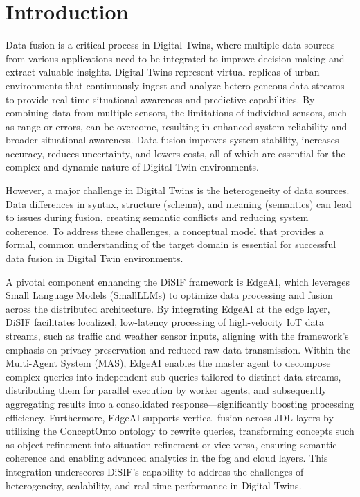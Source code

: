 \documentclass[5p,times]{elsarticle}
\begin{document}
\section{Introduction}
Data fusion is a critical process in Digital Twins,
where multiple data sources from various applications need to
be integrated to improve decision-making and extract valuable
insights. Digital Twins represent virtual replicas of
urban environments that continuously ingest and analyze hetero
geneous data streams to provide real-time situational awareness
and predictive capabilities. By combining data from multiple
sensors, the limitations of individual sensors, such as range or
errors, can be overcome, resulting in enhanced system reliability
and broader situational awareness. Data fusion improves system
stability, increases accuracy, reduces uncertainty, and lowers
costs, all of which are essential for the complex and dynamic
nature of Digital Twin environments.

However, a major challenge in Digital Twins is
the heterogeneity of data sources. Data differences in syntax,
structure (schema), and meaning (semantics) can lead to issues
during fusion, creating semantic conflicts and reducing system
coherence. To address these challenges, a conceptual model
that provides a formal, common understanding of the target
domain is essential for successful data fusion in Digital Twin
environments.

A pivotal component enhancing the DiSIF framework is EdgeAI,
 which leverages Small Language Models (SmallLLMs) to optimize data 
 processing and fusion across the distributed architecture. By integrating 
 EdgeAI at the edge layer, DiSIF facilitates localized, low-latency
  processing of high-velocity IoT data streams, such as traffic and weather
   sensor inputs, aligning with the framework’s emphasis on privacy 
   preservation and reduced raw data transmission. Within the Multi-Agent System (MAS),
    EdgeAI enables the master agent to decompose complex queries into independent 
    sub-queries tailored to distinct data streams, distributing them for parallel 
    execution by worker agents, and subsequently aggregating results into a consolidated
     response—significantly boosting processing efficiency. Furthermore, 
     EdgeAI supports vertical fusion across JDL layers by utilizing the ConceptOnto 
     ontology to rewrite queries, transforming concepts such as object refinement into
      situation refinement or vice versa, ensuring semantic coherence and
       enabling advanced analytics in the fog and cloud layers. This integration
        underscores DiSIF’s capability to address the challenges of 
        heterogeneity, scalability, and real-time performance in Digital Twins.
\end{document}
